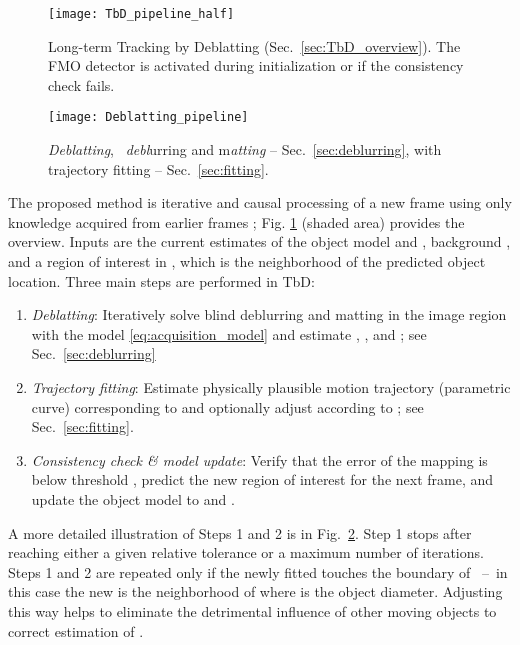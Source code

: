 \documentclass[10pt,twocolumn,letterpaper]{article}
\begin{document}
\begin{figure}[!t]
\centering
\texttt{[image: TbD\_pipeline\_half]}
\caption{Long-term Tracking by Deblatting (Sec.~\ref{sec:TbD_overview}). The FMO detector is activated during initialization or if the consistency check fails.
\label{fig:pipeline_whole}}
\end{figure}

\begin{figure}[!t]
\centering
\texttt{[image: Deblatting\_pipeline]}
\caption{{\it Deblatting}, \ie~{\it debl}urring and m{\it atting} -- Sec.~\ref{sec:deblurring}, with trajectory fitting -- Sec.~\ref{sec:fitting}. 
\label{fig:pipeline_deblatting}}
\end{figure}

The proposed method is iterative and causal processing of a new frame  using only knowledge acquired from earlier frames ; Fig. \ref{fig:pipeline_whole} (shaded area) provides the overview. Inputs are the current estimates of the object model  and , background , and a region of interest  in , which is the neighborhood of the predicted object location. Three main steps are performed in TbD:
\vspace*{-0.5em}
\begin{enumerate}[leftmargin=*]
\setlength\itemsep{-0.25em}
	\item \emph{Deblatting}: Iteratively solve blind deblurring and matting in the image region  with the model \eqref{eq:acquisition_model} and estimate , , and ; see Sec.~\ref{sec:deblurring}
	\item \emph{Trajectory fitting}: Estimate physically plausible motion trajectory (parametric curve)  corresponding to  and optionally adjust  according to ; see Sec.~\ref{sec:fitting}.
	\item \emph{Consistency check \& model update}: Verify that the error of the mapping  is below threshold , predict the new region of interest  for the next frame, and update the object model to  and .
\end{enumerate}
\vspace*{-0.5em}
A more detailed illustration of Steps 1 and 2 is in Fig.~\ref{fig:pipeline_deblatting}. Step 1 stops after reaching either a given relative tolerance or a maximum number of iterations. Steps 1 and 2 are repeated only if the newly fitted  touches the boundary of ~--~in this case the new  is the neighborhood of  where  is the object diameter. Adjusting  this way helps to eliminate the detrimental influence of other moving objects to correct estimation of .
\end{document}
